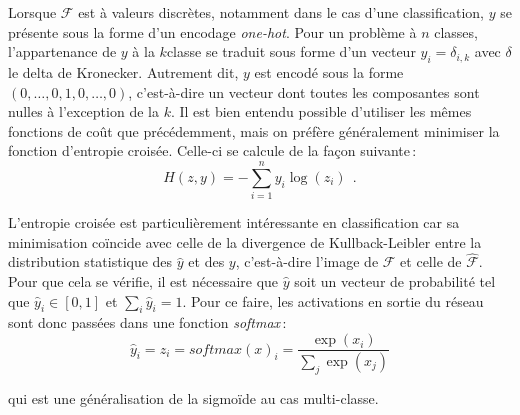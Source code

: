 Lorsque $\mathcal{F}$ est à valeurs discrètes, notamment dans le cas d'une classification, $y$ se présente sous la forme d'un encodage \emph{one-hot}. Pour un problème à $n$ classes, l'appartenance de $y$ à la $k$\ieme classe se traduit sous forme d'un vecteur $y_i = \delta_{i,k}$ avec $\delta$ le delta de Kronecker. Autrement dit, $y$ est encodé sous la forme $(0, \dots, 0, 1, 0, \dots, 0)$, c'est-à-dire un vecteur dont toutes les composantes sont nulles à l'exception de la $k$\ieme. Il est bien entendu possible d'utiliser les mêmes fonctions de coût que précédemment, mais on préfère généralement minimiser la fonction d'entropie croisée. Celle-ci se calcule de la façon suivante\,:
\begin{equation}
  H(z,y) = -\sum_{i=1}^n y_i \log(z_i)~~.
\end{equation}

L'entropie croisée est particulièrement intéressante en classification car sa minimisation coïncide avec celle de la divergence de Kullback-Leibler entre la distribution statistique des $\hat{y}$ et des $y$, c'est-à-dire l'image de $\mathcal{F}$ et celle de $\hat{\mathcal{F}}$. Pour que cela se vérifie, il est nécessaire que $\hat{y}$ soit un vecteur de probabilité tel que $\hat{y}_i \in [0,1]$ et $\sum_i \hat{y}_i = 1$. Pour ce faire, les activations en sortie du réseau sont donc passées dans une fonction \emph{softmax}\,:
\begin{equation}
\hat{y}_i = z_i = \mathit{softmax}(x)_i = \frac{\exp(x_i)}{\sum_j \exp(x_j)}
\end{equation}

qui est une généralisation de la sigmoïde au cas multi-classe.

